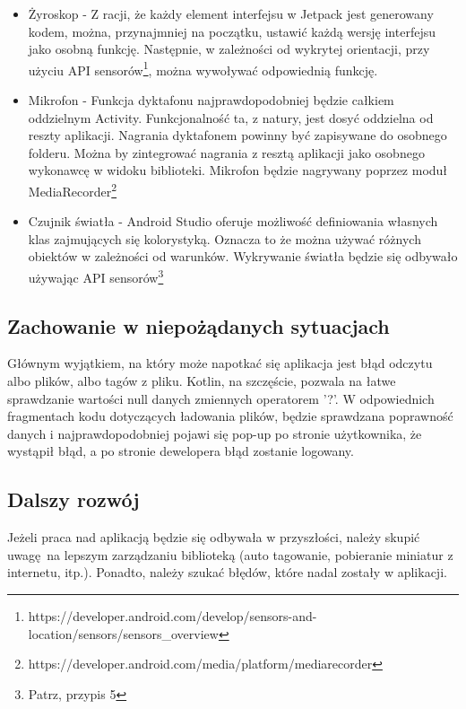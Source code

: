 \begin{itemize}
	\item Żyroskop - Z racji, że każdy element interfejsu w Jetpack jest generowany kodem, można, przynajmniej na początku, ustawić każdą wersję interfejsu jako osobną funkcję. Następnie, w zależności od wykrytej orientacji, przy użyciu API sensorów\footnote{https://developer.android.com/develop/sensors-and-location/sensors/sensors\_overview}, można wywoływać odpowiednią funkcję.
	
	\item Mikrofon - Funkcja dyktafonu najprawdopodobniej będzie całkiem oddzielnym Activity. Funkcjonalność ta, z natury, jest dosyć oddzielna od reszty aplikacji. Nagrania dyktafonem powinny być zapisywane do osobnego folderu. Można by zintegrować nagrania z resztą aplikacji jako osobnego wykonawcę w widoku biblioteki. Mikrofon będzie nagrywany poprzez moduł MediaRecorder\footnote{https://developer.android.com/media/platform/mediarecorder}

	\item Czujnik światła - Android Studio oferuje możliwość definiowania własnych klas zajmujących się kolorystyką. Oznacza to że można używać różnych obiektów w zależności od warunków. Wykrywanie światła będzie się odbywało używając API sensorów\footnote{Patrz, przypis 5} %
\end{itemize}


\subsection{Zachowanie w niepożądanych sytuacjach}

Głównym wyjątkiem, na który może napotkać się aplikacja jest błąd odczytu albo plików, albo tagów z pliku. Kotlin, na szczęście, pozwala na łatwe sprawdzanie wartości null danych zmiennych operatorem '?'. W odpowiednich fragmentach kodu dotyczących ładowania plików, będzie sprawdzana poprawność danych i najprawdopodobniej pojawi się pop-up po stronie użytkownika, że wystąpił błąd, a po stronie dewelopera błąd zostanie logowany.

\subsection{Dalszy rozwój}

Jeżeli praca nad aplikacją będzie się odbywała w przyszłości, należy skupić uwagę na lepszym zarządzaniu biblioteką (auto tagowanie, pobieranie miniatur z internetu, itp.). Ponadto, należy szukać błędów, które nadal zostały w aplikacji.
